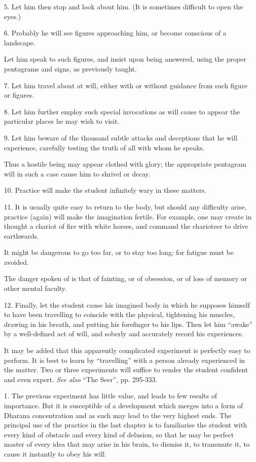5. Let him then stop and look about him. (It is sometimes difficult to open the eyes.)

6. Probably he will see figures approaching him, or become conscious of a landscape.

Let him speak to such figures, and insist upon being answered, using the proper pentagrams and signs, as previously taught.

7. Let him travel about at will, either with or without guidance from such figure or figures.

8. Let him further employ such special invocations as will cause to appear the particular places he may wish to visit.

9. Let him beware of the thousand subtle attacks and deceptions that he will experience, carefully testing the truth of all with whom he speaks.

Thus a hostile being may appear clothed with glory; the appropriate pentagram will in such a case cause him to shrivel or decay.

10. Practice will make the student infinitely wary in these matters.

11. It is usually quite easy to return to the body, but should any difficulty arise, practice (again) will make the imagination fertile. For example, one may create in thought a chariot of fire with white horses, and command the charioteer to drive earthwards.

It might be dangerous to go too far, or to stay too long; for fatigue must be avoided.

The danger spoken of is that of fainting, or of obsession, or of loss of memory or other mental faculty.

12. Finally, let the student cause his imagined body in which he supposes himself to have been travelling to coincide with the physical, tightening his muscles, drawing in his breath, and putting his forefinger to his lips. Then let him \enquote{awake} by a well-defined act of will, and soberly and accurately record his experiences.

It may be added that this apparently complicated experiment is perfectly easy to perform. It is best to learn by \enquote{travelling} with a person already experienced in the matter. Two or three experiments will suffice to render the student confident and even expert. \textit{See also} \enquote{The Seer}, pp. 295-333.




1. The previous experiment has little value, and leads to few results of importance. But it is susceptible of a development which merges into a form of Dharana \textemdash{} concentration \textemdash{} and as such may lead to the very highest ends. The principal use of the practice in the last chapter is to familiarise the student with every kind of obstacle and every kind of delusion, so that he may be perfect master of every idea that may arise in his brain, to dismiss it, to transmute it, to cause it instantly to obey his will.

